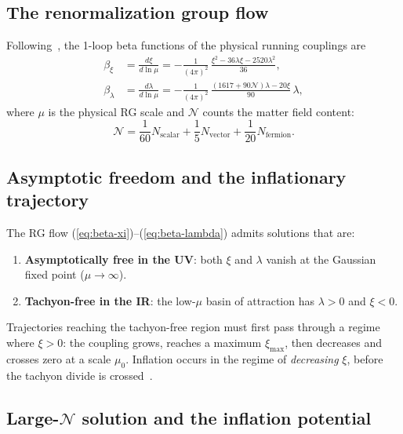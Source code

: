 \documentclass[aps,prd,twocolumn,superscriptaddress,nofootinbib]{revtex4-2}
\begin{document}
\subsection{The renormalization group flow}

Following~\cite{Buccio2024,LiuQuintinAfshordi2026}, the 1-loop beta functions of the physical running couplings are
\begin{align}
\beta_\xi &= \frac{d\xi}{d\ln\mu} = -\frac{1}{(4\pi)^2}\,\frac{\xi^2 - 36\lambda\xi - 2520\lambda^2}{36}, \label{eq:beta-xi}\\
\beta_\lambda &= \frac{d\lambda}{d\ln\mu} = -\frac{1}{(4\pi)^2}\,\frac{(1617 + 90\mathcal{N})\lambda - 20\xi}{90}\,\lambda, \label{eq:beta-lambda}
\end{align}
where $\mu$ is the physical RG scale and $\mathcal{N}$ counts the matter field content:
\begin{equation}
\mathcal{N} = \frac{1}{60}N_\mathrm{scalar} + \frac{1}{5}N_\mathrm{vector} + \frac{1}{20}N_\mathrm{fermion}.
\label{eq:matter-content}
\end{equation}

\subsection{Asymptotic freedom and the inflationary trajectory}

The RG flow (\ref{eq:beta-xi})--(\ref{eq:beta-lambda}) admits solutions that are:
\begin{enumerate}
\item \textbf{Asymptotically free in the UV}: both $\xi$ and $\lambda$ vanish at the Gaussian fixed point ($\mu \to \infty$).
\item \textbf{Tachyon-free in the IR}: the low-$\mu$ basin of attraction has $\lambda > 0$ and $\xi < 0$.
\end{enumerate}

Trajectories reaching the tachyon-free region must first pass through a regime where $\xi > 0$: the coupling grows, reaches a maximum $\xi_\mathrm{max}$, then decreases and crosses zero at a scale $\mu_0$. Inflation occurs in the regime of \textit{decreasing} $\xi$, before the tachyon divide is crossed~\cite{LiuQuintinAfshordi2026}.

\subsection{Large-$\mathcal{N}$ solution and the inflation potential}
\end{document}
